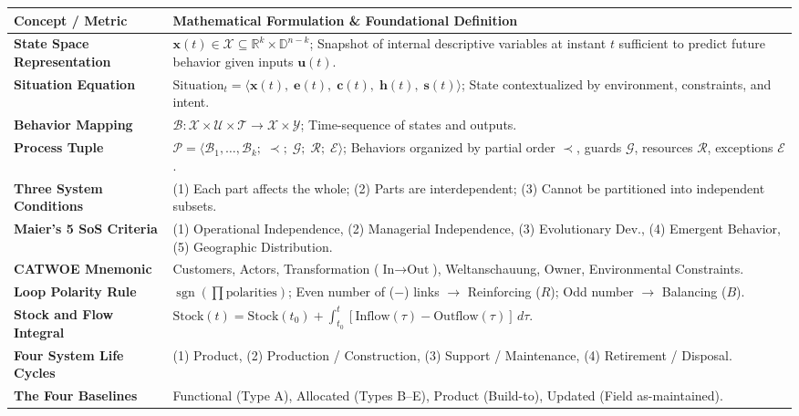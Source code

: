 \begin{table}[htbp]
\centering
\small
\renewcommand{\arraystretch}{1.2}
\begin{tabularx}{\textwidth}{p{4cm}X}
\toprule
\textbf{Concept / Metric} & \textbf{Mathematical Formulation \& Foundational Definition} \\
\midrule
\textbf{State Space Representation} & $\mathbf{x}(t) \in \mathcal{X} \subseteq \mathbb{R}^k \times \mathbb{D}^{n-k}$; Snapshot of internal descriptive variables at instant $t$ sufficient to predict future behavior given inputs $\mathbf{u}(t)$. \\
\textbf{Situation Equation} & $\text{Situation}_t = \langle \mathbf{x}(t), \; \mathbf{e}(t), \; \mathbf{c}(t), \; \mathbf{h}(t), \; \mathbf{s}(t) \rangle$; State contextualized by environment, constraints, and intent. \\
\textbf{Behavior Mapping} & $\mathcal{B}: \mathcal{X} \times \mathcal{U} \times \mathcal{T} \to \mathcal{X} \times \mathcal{Y}$; Time-sequence of states and outputs. \\
\textbf{Process Tuple} & $\mathcal{P} = \langle \mathcal{B}_1, \dots, \mathcal{B}_k; \; \prec; \; \mathcal{G}; \; \mathcal{R}; \; \mathcal{E} \rangle$; Behaviors organized by partial order $\prec$, guards $\mathcal{G}$, resources $\mathcal{R}$, exceptions $\mathcal{E}$. \\
\textbf{Three System Conditions} & (1) Each part affects the whole; (2) Parts are interdependent; (3) Cannot be partitioned into independent subsets. \\
\textbf{Maier's 5 SoS Criteria} & (1) Operational Independence, (2) Managerial Independence, (3) Evolutionary Dev., (4) Emergent Behavior, (5) Geographic Distribution. \\
\textbf{CATWOE Mnemonic} & Customers, Actors, Transformation ($\text{In} \to \text{Out}$), Weltanschauung, Owner, Environmental Constraints. \\
\textbf{Loop Polarity Rule} & $\operatorname{sgn}(\prod \text{polarities})$; Even number of ($-$) links $\to$ Reinforcing ($R$); Odd number $\to$ Balancing ($B$). \\
\textbf{Stock and Flow Integral} & $\text{Stock}(t) = \text{Stock}(t_0) + \int_{t_0}^t \left[ \text{Inflow}(\tau) - \text{Outflow}(\tau) \right] \, d\tau$. \\
\textbf{Four System Life Cycles} & (1) Product, (2) Production / Construction, (3) Support / Maintenance, (4) Retirement / Disposal. \\
\textbf{The Four Baselines} & Functional (Type A), Allocated (Types B--E), Product (Build-to), Updated (Field as-maintained). \\

\end{tabularx}
\end{table}
